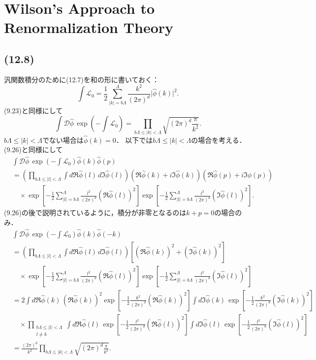 \section{Wilson's Approach to Renormalization Theory}
\subsection{(12.8)}
汎関数積分のために(12.7)を和の形に書いておく：
\[
\int \mathcal{L}_0 = \frac{1}{2} \sum_{\lvert k\rvert = b\Lambda}^\Lambda \frac{k^2}{(2\pi)^d} \lvert \hat\phi(k) \rvert^2 .
\]
(9.23)と同様にして
\[
\int \mathcal{D}\hat\phi \, \exp \left( - \int \mathcal{L}_0 \right)
= \prod_{b\Lambda \leq \lvert k\rvert < \Lambda} \sqrt{(2\pi)^d\frac{\pi}{k^2}} .
\]
$b\Lambda \leq \lvert k \rvert < \Lambda$でない場合は$\hat\phi(k) = 0$．
以下では$b\Lambda \leq \lvert k \rvert < \Lambda$の場合を考える．
(9.26)と同様にして
\begin{align*}
  & \int \mathcal{D}\hat\phi \, \exp \left( - \int \mathcal{L}_0 \right) \hat\phi(k) \hat\phi(p) \\
  &= \left( \prod_{b\Lambda \leq \lvert l\rvert < \Lambda} \int d \Re\hat\phi(l) \, d \Im\hat\phi(l) \right)
  \left( \Re\hat\phi(k) + i \Im\hat\phi(k) \right) \left( \Re\hat\phi(p) + i \Im\hat\phi(p) \right) \\
  & \quad \times \exp \left[ - \frac{1}{2} \sum_{\lvert l\rvert = b\Lambda}^\Lambda \frac{l^2}{(2\pi)^d} (\Re \hat\phi(l))^2 \right]
  \exp \left[ - \frac{1}{2} \sum_{\lvert l\rvert = b\Lambda}^\Lambda \frac{l^2}{(2\pi)^d} (\Im \hat\phi(l))^2 \right] .
\end{align*}
(9.26)の後で説明されているように，積分が非零となるのは$k + p = 0$の場合のみ．
\begin{align*}
  & \int \mathcal{D}\hat\phi \, \exp \left( - \int \mathcal{L}_0 \right) \hat\phi(k) \hat\phi(-k) \\
  &= \left( \prod_{b\Lambda \leq \lvert l\rvert < \Lambda} \int d \Re\hat\phi(l) \, d \Im\hat\phi(l) \right)
  \left[ (\Re\hat\phi(k))^2 + (\Im\hat\phi(k))^2 \right] \\
  & \quad \times \exp \left[ - \frac{1}{2} \sum_{\lvert l\rvert = b\Lambda}^\Lambda \frac{l^2}{(2\pi)^d} (\Re \hat\phi(l))^2 \right]
  \exp \left[ - \frac{1}{2} \sum_{\lvert l\rvert = b\Lambda}^\Lambda \frac{l^2}{(2\pi)^d} (\Im \hat\phi(l))^2 \right] \\
  &= 2 \int d \Re\hat\phi(k) \, (\Re\hat\phi(k))^2 \exp \left[ - \frac{1}{2} \frac{k^2}{(2\pi)^d} (\Re \hat\phi(k))^2 \right]
  \int d \Im\hat\phi(k) \, \exp \left[ - \frac{1}{2} \frac{k^2}{(2\pi)^d} (\Im \hat\phi(k))^2 \right] \\
  & \quad\times \prod_{\substack{b\Lambda \leq \lvert l\rvert < \Lambda \\ l \neq k}}
  \int d \Re\hat\phi(l) \, \exp \left[ - \frac{1}{2} \frac{l^2}{(2\pi)^d} (\Re \hat\phi(l))^2 \right]
  \int d \Im\hat\phi(l) \, \exp \left[ - \frac{1}{2} \frac{l^2}{(2\pi)^d} (\Im \hat\phi(l))^2 \right] \\
  &= \frac{(2\pi)^d}{k^2} \prod_{b\Lambda \leq \lvert k\rvert < \Lambda} \sqrt{(2\pi)^d\frac{\pi}{k^2}} .
\end{align*}
